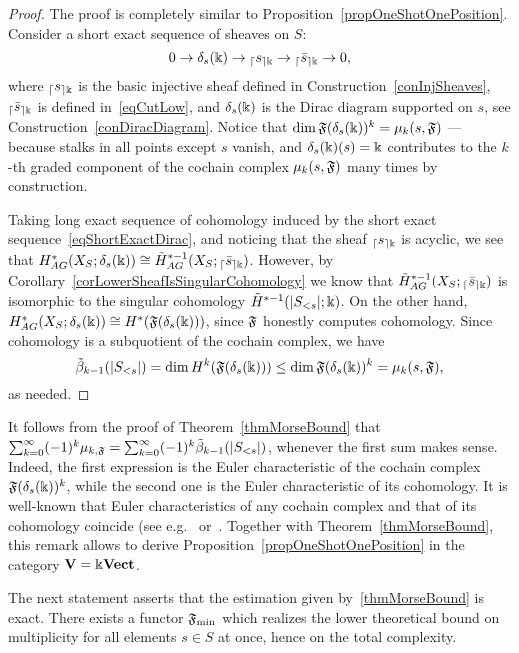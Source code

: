 \begin{proof}
The proof is completely similar to Proposition~\ref{propOneShotOnePosition}. Consider a short exact sequence of sheaves on $S$:
\begin{equation}\label{eqShortExactDirac}
0\to \delta_s(\Bbbk)\to{_{\lceil}s_{\rceil \Bbbk}}\to {_{\lceil}\bar{s}_{\rceil \Bbbk}}\to 0,
\end{equation}
where ${_{\lceil}s_{\rceil \Bbbk}}$ is the basic injective sheaf defined in Construction~\ref{conInjSheaves}, ${_{\lceil}\bar{s}_{\rceil \Bbbk}}$ is defined in~\eqref{eqCutLow}, and $\delta_s(\Bbbk)$ is the Dirac diagram supported on $s$, see Construction~\ref{conDiracDiagram}. Notice that $\dim \mathfrak{F}(\delta_s(\Bbbk))^k=\mu_k(s,\mathfrak{F})$ --- because stalks in all points except $s$ vanish, and $\delta_s(\Bbbk)(s)=\Bbbk$ contributes to the $k$-th graded component of the cochain complex $\mu_k(s,\mathfrak{F})$ many times by construction.

Taking long exact sequence of cohomology induced by the short exact sequence~\eqref{eqShortExactDirac}, and noticing that the sheaf ${_{\lceil}s_{\rceil \Bbbk}}$ is acyclic, we see that $H_{AG}^*(X_S;\delta_s(\Bbbk))\cong \tilde{H}_{AG}^{*-1}(X_S;{_{\lceil}\bar{s}_{\rceil \Bbbk}})$. However, by Corollary~\ref{corLowerSheafIsSingularCohomology} we know that $\tilde{H}_{AG}^{*-1}(X_S;{_{\lceil}\bar{s}_{\rceil \Bbbk}})$ is isomorphic to the singular cohomology $\tilde{H}^{*-1}(|S_{<s}|;\Bbbk)$. On the other hand, $H_{AG}^*(X_S;\delta_s(\Bbbk))\cong H^*(\mathfrak{F}(\delta_s(\Bbbk)))$, since $\mathfrak{F}$ honestly computes cohomology. Since cohomology is a subquotient of the cochain complex, we have
\[
\tilde{\beta}_{k-1}(|S_{<s}|)=\dim H^{k}(\mathfrak{F}(\delta_s(\Bbbk)))\leq \dim \mathfrak{F}(\delta_s(\Bbbk))^k=\mu_k(s,\mathfrak{F}),
\]
as needed.
\end{proof}

\begin{rem}\label{remEulerChar}
It follows from the proof of Theorem~\ref{thmMorseBound} that $\sum_{k=0}^{\infty}(-1)^k\mu_{k,\mathfrak{F}}=\sum_{k=0}^{\infty}(-1)^k\tilde{\beta}_{k-1}(|S_{<s}|)$, whenever the first sum makes sense. Indeed, the first expression is the Euler characteristic of the cochain complex $\mathfrak{F}(\delta_s(\Bbbk))^k$, while the second one is the Euler characteristic of its cohomology. It is well-known that Euler characteristics of any cochain complex and that of its cohomology coincide (see e.g.~\cite[Thm.2.44]{Hatcher} or~\cite[Lm.5.1]{robinson2014topological}. Together with Theorem~\ref{thmMorseBound}, this remark allows to derive Proposition~\ref{propOneShotOnePosition} in the category $\mathbf{V}=\Bbbk\mathbf{Vect}$.
\end{rem}

The next statement asserts that the estimation given by~\ref{thmMorseBound} is exact. There exists a functor $\mathfrak{F}_{\min}$ which realizes the lower theoretical bound on multiplicity for all elements $s\in S$ at once, hence on the total complexity.

